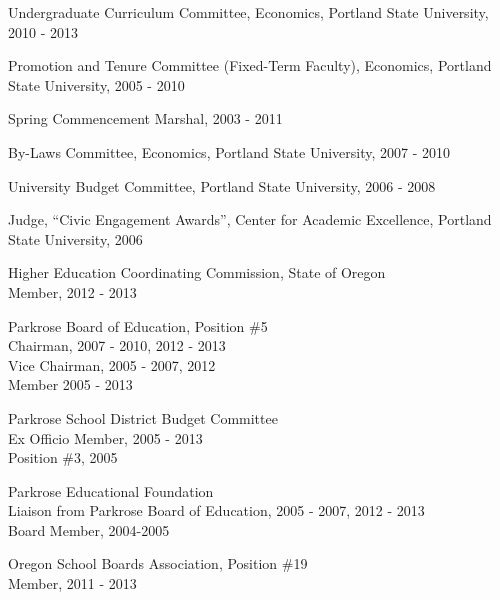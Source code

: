 \documentclass[Computer Science]{vita}
\begin{document}
\begin{vita}
\begin{Professional and Service Activities}
\begin{University}
    \item Undergraduate Curriculum Committee, Economics, Portland
      State University, 2010 - 2013

    \item Promotion and Tenure Committee (Fixed-Term Faculty),
      Economics, Portland State University, 2005 - 2010

    \item Spring Commencement Marshal, 2003 - 2011
  
    \item By-Laws Committee, Economics, Portland State University,
      2007 - 2010

    \item University Budget Committee, Portland State University, 2006
      - 2008

    \item Judge, ``Civic Engagement Awards'', Center for Academic
      Excellence, Portland State University, 2006

    \end{University}

    \begin{Community}


\item Higher Education Coordinating Commission, State of Oregon\\
Member, 2012 - 2013

    \item Parkrose Board of Education, Position \#5\\
      Chairman, 2007 - 2010, 2012 - 2013\\
      Vice Chairman, 2005 - 2007, 2012 \\
      Member 2005 - 2013

    \item Parkrose School District Budget Committee\\
      Ex Officio Member, 2005 - 2013\\
      Position \#3, 2005

\item Parkrose Educational Foundation\\
      Liaison from Parkrose Board of Education, 2005 - 2007, 2012 - 2013\\
      Board Member, 2004-2005


    \item Oregon School Boards Association, Position \#19\\
    Member, 2011 - 2013


\end{Community}
\end{Professional and Service Activities}
\end{vita}
\end{document}
